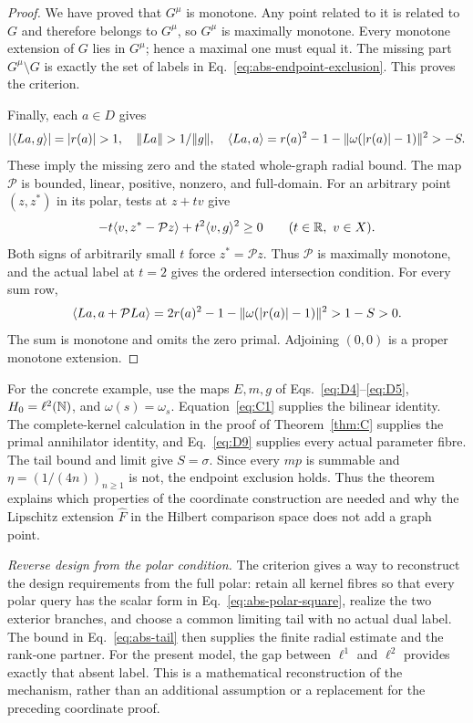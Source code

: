 \begin{proof}
We have proved that $G^\mu$ is monotone. Any point related to it
is related to $G$ and therefore belongs to $G^\mu$, so $G^\mu$
is maximally monotone. Every monotone extension of $G$ lies in
$G^\mu$; hence a maximal one must equal it. The missing part
$G^\mu\setminus G$ is exactly the set of labels in
Eq.~\eqref{eq:abs-endpoint-exclusion}. This proves the criterion.

Finally, each $a\in D$ gives
\[
|\pair{La}{g}|=|r(a)|>1,\quad
\|La\|>1/\|g\|,\quad
\pair{La}{a}=r(a)^2-1-\|\omega(|r(a)|-1)\|^2>-S.
\]
These imply the missing zero and the stated whole-graph radial bound.
The map $\mathcal P$ is bounded, linear, positive, nonzero, and full-domain.
For an arbitrary point $(z,z^*)$ in its polar, tests at $z+tv$ give
\[
-t\langle v,z^*-\mathcal Pz\rangle+t^2\langle v,g\rangle^2\ge0
\qquad(t\in\mathbb R,\ v\in X).
\]
Both signs of arbitrarily small $t$ force $z^*=\mathcal Pz$.
Thus $\mathcal P$ is maximally monotone, and the actual label at
$t=2$ gives the ordered intersection condition. For every sum row,
\[
\langle La,a+\mathcal PLa\rangle
=2r(a)^2-1-\|\omega(|r(a)|-1)\|^2>1-S>0.
\]
The sum is monotone and omits the zero primal. Adjoining $(0,0)$
is a proper monotone extension.
\end{proof}

For the concrete example, use the maps $E,m,g$ of
Eqs.~\eqref{eq:D4}--\eqref{eq:D5}, $H_0=\ell^2(\mathbb N)$, and
$\omega(s)=\omega_s$. Equation~\eqref{eq:C1} supplies the
bilinear identity. The complete-kernel calculation in the proof of
Theorem~\ref{thm:C} supplies the primal annihilator identity,
and Eq.~\eqref{eq:D9} supplies every actual parameter fibre.
The tail bound and limit give $S=\sigma$. Since every $mp$ is
summable and $\eta=(1/(4n))_{n\ge1}$ is not, the endpoint
exclusion holds. Thus the theorem explains which properties of the
coordinate construction are needed and why the Lipschitz extension
$\widehat F$ in the Hilbert comparison space does not add a graph point.

\noindent\textit{Reverse design from the polar condition.}
The criterion gives a way to reconstruct the design requirements from
the full polar: retain all kernel fibres so that every polar query has
the scalar form in Eq.~\eqref{eq:abs-polar-square}, realize the two
exterior branches, and choose a common limiting tail with no actual
dual label. The bound in Eq.~\eqref{eq:abs-tail} then supplies the
finite radial estimate and the rank-one partner. For the present model,
the gap between $\ell^1$ and $\ell^2$ provides exactly that absent
label. This is a mathematical reconstruction of the mechanism, rather
than an additional assumption or a replacement for the preceding
coordinate proof.




